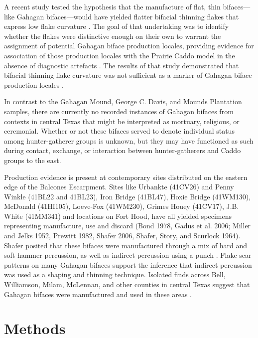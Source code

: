 \documentclass[review]{elsarticle}
\begin{document}
A recent study tested the hypothesis that the manufacture of flat, thin bifaces—like Gahagan bifaces—would have yielded flatter bifacial thinning flakes that express low flake curvature \citep{RN11568}. The goal of that undertaking was to identify whether the flakes were distinctive enough on their own to warrant the assignment of potential Gahagan biface production locales, providing evidence for association of those production locales with the Prairie Caddo model \citep{RN4924} in the absence of diagnostic artefacts \citep{RN11568}. The results of that study demonstrated that bifacial thinning flake curvature was not sufficient as a marker of Gahagan biface production locales \citep{RN11568}.

In contrast to the Gahagan Mound, George C. Davis, and Mounds Plantation samples, there are currently no recorded instances of Gahagan bifaces from contexts in central Texas that might be interpreted as mortuary, religious, or ceremonial. Whether or not these bifaces served to denote individual status among hunter-gatherer groups is unknown, but they may have functioned as such during contact, exchange, or interaction between hunter-gatherers and Caddo groups to the east.

Production evidence is present at contemporary sites distributed on the eastern edge of the Balcones Escarpment. Sites like Urbankte (41CV26) and Penny Winkle (41BL22 and 41BL23), Iron Bridge (41BL47), Hoxie Bridge (41WM130), McDonald (41HI105), Loeve-Fox (41WM230), Grimes Houey (41CV17), J.B. White (41MM341) and locations on Fort Hood, have all yielded specimens representing manufacture, use and discard (Bond 1978, Gadus et al. 2006; Miller and Jelks 1952, Prewitt 1982, Shafer 2006, Shafer, Story, and Scurlock 1964). Shafer posited that these bifaces were manufactured through a mix of hard and soft hammer percussion, as well as indirect percussion using a punch \citep{RN4924,RN3684}. Flake scar patterns on many Gahagan bifaces support the inference that indirect percussion was used as a shaping and thinning technique. Isolated finds across Bell, Williamson, Milam, McLennan, and other counties in central Texas suggest that Gahagan bifaces were manufactured and used in these areas \citep{RN4924}.

\section*{Methods}
\end{document}
